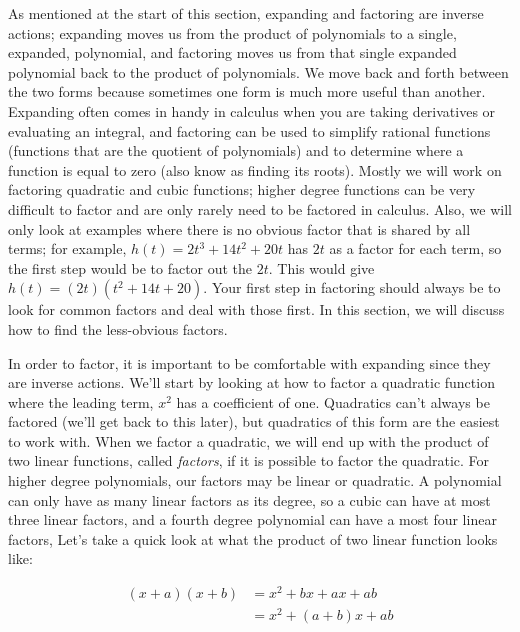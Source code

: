 As mentioned at the start of this section, expanding and factoring are inverse actions; expanding moves us from the product of polynomials to a single, expanded, polynomial, and factoring moves us from that single expanded polynomial back to the product of polynomials. We move back and forth between the two forms because sometimes one form is much more useful than another. Expanding often comes in handy in calculus when you are taking derivatives or evaluating an integral, and factoring can be used to simplify rational functions (functions that are the quotient of polynomials) and to determine where a function is equal to zero (also know as finding its roots). Mostly we will work on factoring quadratic and cubic functions; higher degree functions can be very difficult to factor and are only rarely need to be factored in calculus. Also, we will only look at examples where there is no obvious factor that is shared by all terms; for example, $h(t) = 2t^3+14t^2+20t$ has $2t$ as a factor for each term, so the first step would be to factor out the $2t$. This would give $h(t)=(2t)(t^2+14t+20)$. Your first step in factoring should always be to look for common factors and deal with those first. In this section, we will discuss how to find the less-obvious factors.

In order to factor, it is important to be comfortable with expanding since they are inverse actions. We'll start by looking at how to factor a quadratic function where the leading term, $x^2$ has a coefficient of one. Quadratics can't always be factored (we'll get back to this later), but quadratics of this form are the easiest to work with. When we factor a quadratic, we will end up with the product of two linear functions, called \emph{factors}, if it is possible to factor the quadratic. For higher degree polynomials, our factors may be linear or quadratic. A polynomial can only have as many linear factors as its degree, so a cubic can have at most three linear factors, and a fourth degree polynomial can have a most four linear factors, Let's take a quick look at what the product of two linear function looks like:

\begin{equation}\label{eqn:expanding_linear_factors}
	\begin{split}
	(x+a)(x+b) & = x^2 + bx + ax + ab \\
		   & = x^2 + (a+b)x + ab
	\end{split}
\end{equation}


